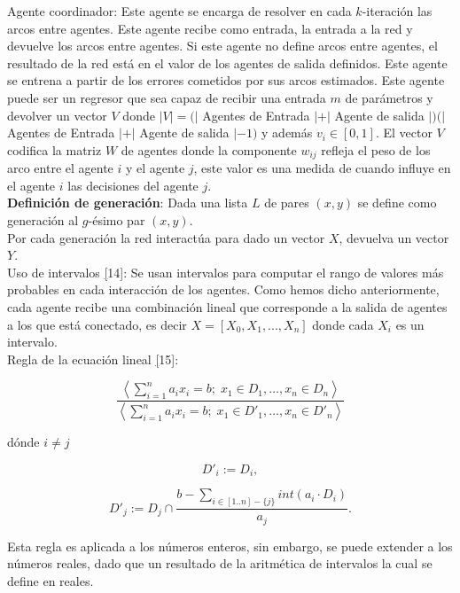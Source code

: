         Agente coordinador: Este agente se encarga de resolver en cada $k$-iteración las arcos entre agentes. Este agente recibe como entrada, la entrada a la red 
        y devuelve los arcos entre agentes. Si este agente no define arcos entre agentes, el resultado de la red está en el valor de los agentes de salida definidos. Este agente se entrena 
        a partir de los errores cometidos por sus arcos estimados. Este agente puede ser un regresor que sea capaz de recibir una entrada $m$ de parámetros y devolver
         un vector $V$ donde $|V|=(|$ Agentes de Entrada $| + |$ Agente de salida $|)(|$ Agentes de Entrada $| + |$ Agente de salida $| - 1)$ y además $v_i \in [0,1]$.
          El vector $V$ codifica la matriz $W$ de agentes donde la componente $w_{ij}$ refleja el peso de los arco entre el agente $i$ y el agente $j$, este valor es una 
          medida de cuando influye en el agente $i$ las decisiones del agente $j$.\\

        \textbf{Definición de generación}: Dada una lista $L$ de pares $(x,y)$ se define como generación al $g$-ésimo par $(x,y)$. \\

        Por cada generación la red interactúa para dado un vector $X$, devuelva un vector $Y$.\\

        Uso de intervalos \hyperref[sec:24][14]: Se usan intervalos para computar el rango de valores más probables en cada interacción de los agentes. Como hemos dicho anteriormente, cada agente recibe una combinación lineal
        que corresponde a la salida de agentes a los que está conectado, es decir $X=[X_0,X_1,...,X_n]$ donde cada $X_i$ es un intervalo. \\

        Regla de la ecuación lineal \hyperref[sec:25][15]:

                $$\frac{\left\langle \sum_{i=1}^{n} a_i x_i = b ; \; x_1 \in D_1, \ldots, x_n \in D_n \right\rangle}
                {\left\langle \sum_{i=1}^{n} a_i x_i = b ; \; x_1 \in D'_1, \ldots, x_n \in D'_n \right\rangle}$$

            dónde $i \neq j$

            \[ D'_i := D_i, \]

            \[ D'_j := D_j \cap \frac{b - \sum_{i \in [1..n] - \{j\}} int(a_i \cdot D_i)}{a_j}. \]

            Esta regla es aplicada a los números enteros, sin embargo, se puede extender a los números reales, dado que un resultado de la aritmética de intervalos la cual se define en reales.\\

